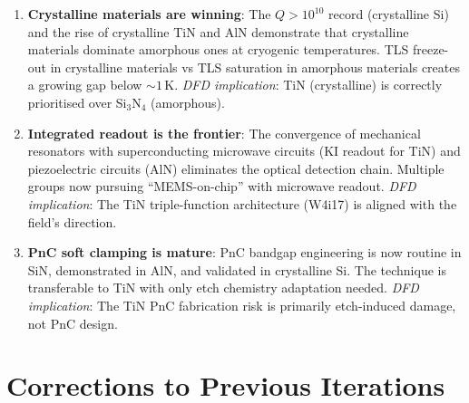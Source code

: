 \documentclass[11pt]{article}
\theoremstyle{remark}
\begin{document}
\begin{enumerate}
  \item \textbf{Crystalline materials are winning}: The $Q > 10^{10}$
    record (crystalline Si) and the rise of crystalline TiN and AlN
    demonstrate that crystalline materials dominate amorphous ones at
    cryogenic temperatures. TLS freeze-out in crystalline materials
    vs TLS saturation in amorphous materials creates a growing gap
    below $\sim 1$\,K. \emph{DFD implication}: TiN (crystalline) is
    correctly prioritised over Si$_3$N$_4$ (amorphous).

  \item \textbf{Integrated readout is the frontier}: The convergence
    of mechanical resonators with superconducting microwave circuits
    (KI readout for TiN) and piezoelectric circuits (AlN) eliminates
    the optical detection chain. Multiple groups now pursuing
    ``MEMS-on-chip'' with microwave readout.
    \emph{DFD implication}: The TiN triple-function architecture
    (W4i17) is aligned with the field's direction.

  \item \textbf{PnC soft clamping is mature}: PnC bandgap engineering
    is now routine in SiN, demonstrated in AlN, and validated in
    crystalline Si. The technique is transferable to TiN with only
    etch chemistry adaptation needed.
    \emph{DFD implication}: The TiN PnC fabrication risk is primarily
    etch-induced damage, not PnC design.
\end{enumerate}


\section{Corrections to Previous Iterations}
\label{sec:corrections}
\end{document}

